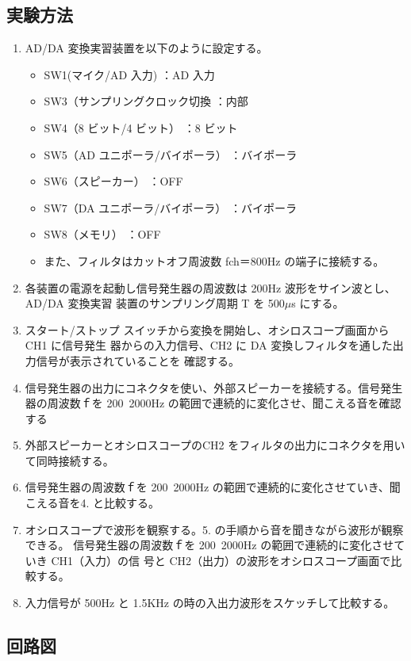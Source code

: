 \documentclass[10pt]{article}
\begin{document}
\subsection{実験方法}

\begin{enumerate}
    \item AD/DA 変換実習装置を以下のように設定する。 
    \begin{itemize}
        \item SW1(マイク/AD 入力)  ：AD 入力 
        \item SW3（サンプリングクロック切換 ：内部 
        \item SW4（8 ビット/4 ビット）  ：8 ビット 
        \item SW5（AD ユニポーラ/バイポーラ） ：バイポーラ 
        \item SW6（スピーカー）  ：OFF 
        \item SW7（DA ユニポーラ/バイポーラ） ：バイポーラ 
        \item SW8（メモリ）   ：OFF
        \item また、フィルタはカットオフ周波数 fch＝800Hz の端子に接続する。 
    \end{itemize} 
    \item 各装置の電源を起動し信号発生器の周波数は 200Hz 波形をサイン波とし、AD/DA 変換実習 装置のサンプリング周期 T を 500$\mu$s にする。 
    \item スタート/ストップ スイッチから変換を開始し、オシロスコープ画面から CH1 に信号発生 器からの入力信号、CH2 に DA 変換しフィルタを通した出力信号が表示されていることを 確認する。
    \item 信号発生器の出力にコネクタを使い、外部スピーカーを接続する。信号発生器の周波数ｆを 200~2000Hz の範囲で連続的に変化させ、聞こえる音を確認する
    \item 外部スピーカーとオシロスコープのCH2 をフィルタの出力にコネクタを用いて同時接続する。
    \item 信号発生器の周波数ｆを 200~2000Hz の範囲で連続的に変化させていき、聞こえる音を4. と比較する。 
    \item オシロスコープで波形を観察する。5. の手順から音を聞きながら波形が観察できる。 信号発生器の周波数ｆを 200~2000Hz の範囲で連続的に変化させていき CH1（入力）の信 号と CH2（出力）の波形をオシロスコープ画面で比較する。 
    \item 入力信号が 500Hz と 1.5KHz の時の入出力波形をスケッチして比較する。
\end{enumerate}

\subsection{回路図}
\end{document}
